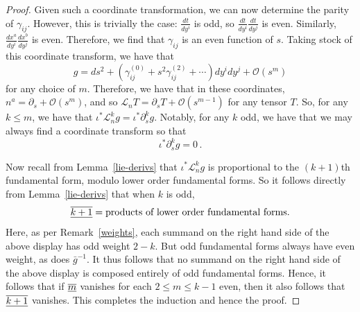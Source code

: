 \documentclass[10pt,a4paper]{amsart}
\newcommand{\FF}[1]{\underline{\overline{\rm{#1}}}}
\renewcommand\leq{\leqslant}
\begin{document}
\begin{proof}
Given such a coordinate transformation, we can now determine the parity of $\gamma_{ij}$. However, this is trivially the case: $\frac{dt}{dy^i}$ is odd, so $\frac{dt}{dy^i} \frac{dt}{dy^j}$ is even. Similarly, $\frac{dx^a}{dy^i} \frac{dx^b}{dy^j}$ is even. Therefore, we find that $\gamma_{ij}$ is an even function of $s$. Taking stock of this coordinate transform, we have that
$$g = ds^2 + (\gamma^{(0)}_{ij} + s^2 \gamma^{(2)}_{ij} + \cdots) dy^i dy^j + \mathcal{O}(s^m)$$
for any choice of $m$. Therefore, we have that in these coordinates, $n^a =  \partial_s + \mathcal{O}(s^m)$, and so $\mathcal{L}_{n} T = \partial_s T + \mathcal{O}(s^{m-1})$ for any tensor $T$. So, for any $k \leq m$, we have that $\iota^* \mathcal{L}_n^k g = \iota^* \partial_s^k g$. Notably, for any $k$ odd, we have that we may always find a coordinate transform so that
$$\iota^* \partial_s^k g = 0\,.$$

Now recall from Lemma~\ref{lie-derivs} that $\iota^* \mathcal{L}_n^k g$ is proportional to the $(k+1)$th fundamental form, modulo lower order fundamental forms. So it follows directly from  Lemma~\ref{lie-derivs} that when $k$ is odd,
$$ \FF{k+1} = \text{products of lower order fundamental forms.}$$
Here, as per Remark~\ref{weights}, each summand on the right hand side of the above display has odd weight $2-k$. But odd fundamental forms always have even weight, as does $\bar{g}^{-1}$. It thus follows that no summand on the right hand side of the above display is composed entirely of odd fundamental forms. Hence, it follows that if $\FF{m}$ vanishes for each $2 \leq m \leq k-1$ even, then it also follows that $\FF{k+1}$ vanishes. This completes the induction and hence the proof.

\end{proof}
\end{document}
